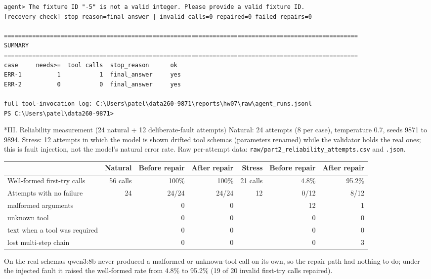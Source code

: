 \documentclass[11pt]{article}
\makeatletter
\renewcommand\subsection{\@startsection{subsection}{2}{\z@}{-2.2ex \@plus -1ex \@minus -.2ex}{0.8ex \@plus.2ex}{\normalfont\fontsize{12}{14.5}\selectfont\bfseries}}
\makeatother
\begin{document}
\begin{lstlisting}
agent> The fixture ID "-5" is not a valid integer. Please provide a valid fixture ID.
[recovery check] stop_reason=final_answer | invalid calls=0 repaired=0 failed repairs=0

====================================================================================================
SUMMARY
====================================================================================================
case     needs>=  tool calls  stop_reason      ok
ERR-1          1           1  final_answer     yes
ERR-2          0           0  final_answer     yes

full tool-invocation log: C:\Users\patel\data260-9871\reports\hw07\raw\agent_runs.jsonl
PS C:\Users\patel\data260-9871>
\end{lstlisting}
\endgroup
\subsection*{III. Reliability measurement (24 natural + 12 deliberate-fault attempts)}
Natural: 24 attempts (8 per case), temperature 0.7, seeds 9871 to 9894. Stress: 12 attempts in which the model is shown drifted tool schemas (parameters renamed) while the validator holds the real ones; this is fault injection, not the model's natural error rate. Raw per-attempt data: \texttt{raw/\allowbreak{}part2\_\allowbreak{}reliability\_\allowbreak{}attempts.csv} and \texttt{.json}.

\begin{center}
{\footnotesize\setlength{\tabcolsep}{3pt}
\begin{tabular}{lrrrrrr}
\toprule
\textbf{} & \textbf{Natural} & \textbf{Before repair} & \textbf{After repair} & \textbf{Stress} & \textbf{Before repair} & \textbf{After repair} \\
\midrule
Well-formed first-try calls & 56 calls & 100\% & 100\% & 21 calls & 4.8\% & 95.2\% \\
Attempts with no failure & 24 & 24/24 & 24/24 & 12 & 0/12 & 8/12 \\
malformed arguments &  & 0 & 0 &  & 12 & 1 \\
unknown tool &  & 0 & 0 &  & 0 & 0 \\
text when a tool was required &  & 0 & 0 &  & 0 & 0 \\
lost multi-step chain &  & 0 & 0 &  & 0 & 3 \\
\bottomrule
\end{tabular}}
\end{center}
On the real schemas qwen3:8b never produced a malformed or unknown-tool call on its own, so the repair path had nothing to do; under the injected fault it raised the well-formed rate from 4.8\% to 95.2\% (19 of 20 invalid first-try calls repaired).
\end{document}
